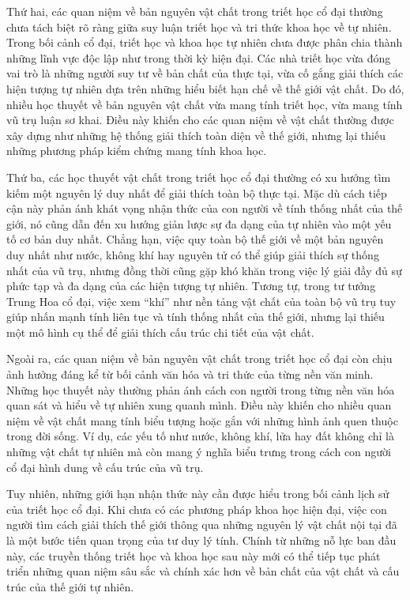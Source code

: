 \documentclass[14pt,a4paper]{extarticle}
\begin{document}
Thứ hai, các quan niệm về bản nguyên vật chất trong triết học cổ đại thường chưa tách biệt rõ ràng giữa suy luận triết học và tri thức khoa học về tự nhiên. Trong bối cảnh cổ đại, triết học và khoa học tự nhiên chưa được phân chia thành những lĩnh vực độc lập như trong thời kỳ hiện đại. Các nhà triết học vừa đóng vai trò là những người suy tư về bản chất của thực tại, vừa cố gắng giải thích các hiện tượng tự nhiên dựa trên những hiểu biết hạn chế về thế giới vật chất. Do đó, nhiều học thuyết về bản nguyên vật chất vừa mang tính triết học, vừa mang tính vũ trụ luận sơ khai. Điều này khiến cho các quan niệm về vật chất thường được xây dựng như những hệ thống giải thích toàn diện về thế giới, nhưng lại thiếu những phương pháp kiểm chứng mang tính khoa học.

Thứ ba, các học thuyết vật chất trong triết học cổ đại thường có xu hướng tìm kiếm một nguyên lý duy nhất để giải thích toàn bộ thực tại. Mặc dù cách tiếp cận này phản ánh khát vọng nhận thức của con người về tính thống nhất của thế giới, nó cũng dẫn đến xu hướng giản lược sự đa dạng của tự nhiên vào một yếu tố cơ bản duy nhất. Chẳng hạn, việc quy toàn bộ thế giới về một bản nguyên duy nhất như nước, không khí hay nguyên tử có thể giúp giải thích sự thống nhất của vũ trụ, nhưng đồng thời cũng gặp khó khăn trong việc lý giải đầy đủ sự phức tạp và đa dạng của các hiện tượng tự nhiên. Tương tự, trong tư tưởng Trung Hoa cổ đại, việc xem ``khí'' như nền tảng vật chất của toàn bộ vũ trụ tuy giúp nhấn mạnh tính liên tục và tính thống nhất của thế giới, nhưng lại thiếu một mô hình cụ thể để giải thích cấu trúc chi tiết của vật chất.

Ngoài ra, các quan niệm về bản nguyên vật chất trong triết học cổ đại còn chịu ảnh hưởng đáng kể từ bối cảnh văn hóa và tri thức của từng nền văn minh. Những học thuyết này thường phản ánh cách con người trong từng nền văn hóa quan sát và hiểu về tự nhiên xung quanh mình. Điều này khiến cho nhiều quan niệm về vật chất mang tính biểu tượng hoặc gắn với những hình ảnh quen thuộc trong đời sống. Ví dụ, các yếu tố như nước, không khí, lửa hay đất không chỉ là những vật chất tự nhiên mà còn mang ý nghĩa biểu trưng trong cách con người cổ đại hình dung về cấu trúc của vũ trụ.

Tuy nhiên, những giới hạn nhận thức này cần được hiểu trong bối cảnh lịch sử của triết học cổ đại. Khi chưa có các phương pháp khoa học hiện đại, việc con người tìm cách giải thích thế giới thông qua những nguyên lý vật chất nội tại đã là một bước tiến quan trọng của tư duy lý tính. Chính từ những nỗ lực ban đầu này, các truyền thống triết học và khoa học sau này mới có thể tiếp tục phát triển những quan niệm sâu sắc và chính xác hơn về bản chất của vật chất và cấu trúc của thế giới tự nhiên.
\end{document}
